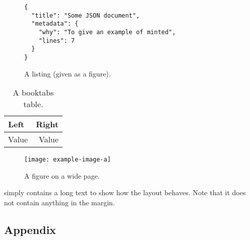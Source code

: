 \documentclass[
  b5paper,
  fontsize = 11pt,
  english,
  roman equations,
]{thesis}
\begin{document}
  \begin{figure}
    \begin{verbatim}
{
  "title": "Some JSON document",
  "metadata": {
    "why": "To give an example of minted",
    "lines": 7
  }
}
    \end{verbatim}
    \caption{A listing (given as a figure).}
  \end{figure}

  \begin{table}
    \begin{tabular}{l r}
      \toprule
      Left & Right
      \\
      \midrule
      Value & Value
      \\
      \bottomrule
    \end{tabular}
    \caption{A \textsf{booktabs} table.}
  \end{table}

  \begin{figure}[p]
    \texttt{[image: example-image-a]}
    \caption{A figure on a wide page.}
  \end{figure}

   simply contains a long text to show how the layout behaves.
  Note that it does not contain anything in the margin.

  \begin{appendices}
    \chapter{Appendix}\label{app}
    \Blindtext[5]
    \Blinditemize
    \Blindtext[5]
    \Blindenumerate
    \Blindtext[5]
    \Blinddescription
    \Blindtext[5]
  \end{appendices}

  \backmatter

  \printbibliography

  \printindex\label{index}

  \glsaddall[types={notations}]
  \printglossary[
    type=notations,
    style=long-symbol,
    nonumberlist,
  ]
\end{document}
